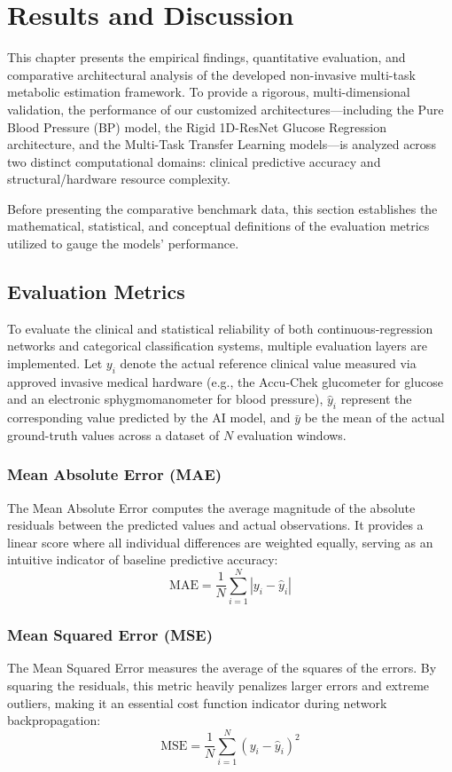 \chapter{Results and Discussion}
\label{ch:results}

This chapter presents the empirical findings, quantitative evaluation, and comparative architectural analysis of the developed non-invasive multi-task metabolic estimation framework. To provide a rigorous, multi-dimensional validation, the performance of our customized architectures—including the Pure Blood Pressure (BP) model, the Rigid 1D-ResNet Glucose Regression architecture, and the Multi-Task Transfer Learning models—is analyzed across two distinct computational domains: clinical predictive accuracy and structural/hardware resource complexity.

Before presenting the comparative benchmark data, this section establishes the mathematical, statistical, and conceptual definitions of the evaluation metrics utilized to gauge the models' performance.

\section{Evaluation Metrics}
To evaluate the clinical and statistical reliability of both continuous-regression networks and categorical classification systems, multiple evaluation layers are implemented. Let $y_i$ denote the actual reference clinical value measured via approved invasive medical hardware (e.g., the Accu-Chek glucometer for glucose and an electronic sphygmomanometer for blood pressure), $\hat{y}_i$ represent the corresponding value predicted by the AI model, and $\bar{y}$ be the mean of the actual ground-truth values across a dataset of $N$ evaluation windows.

\subsection{Mean Absolute Error (MAE)}
The Mean Absolute Error computes the average magnitude of the absolute residuals between the predicted values and actual observations. It provides a linear score where all individual differences are weighted equally, serving as an intuitive indicator of baseline predictive accuracy:
\begin{equation}
\text{MAE} = \frac{1}{N} \sum_{i=1}^{N} |y_i - \hat{y}_i|
\end{equation}

\subsection{Mean Squared Error (MSE)}
The Mean Squared Error measures the average of the squares of the errors. By squaring the residuals, this metric heavily penalizes larger errors and extreme outliers, making it an essential cost function indicator during network backpropagation:
\begin{equation}
\text{MSE} = \frac{1}{N} \sum_{i=1}^{N} (y_i - \hat{y}_i)^2
\end{equation}

